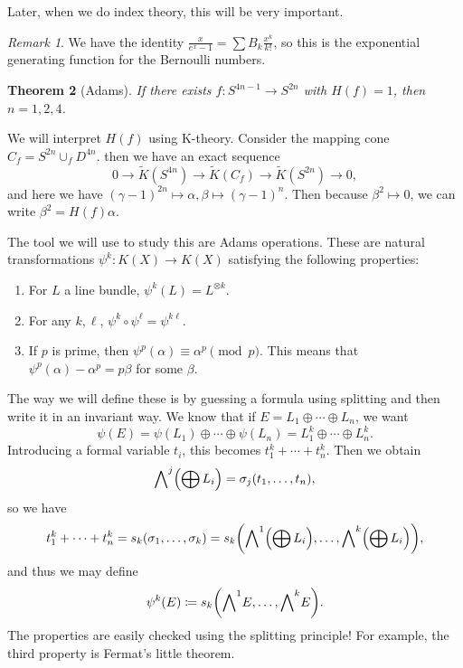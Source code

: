 \documentclass[leqno, openany]{memoir}
\newtheorem{thm}{Theorem}[section]
\theoremstyle{definition}
\theoremstyle{remark}
\newtheorem{rmk}[thm]{Remark}
\theoremstyle{plain}
\theoremstyle{definition}
\theoremstyle{remark}
\newcommand{\wt}[1]{\widetilde{#1}}
\begin{document}
Later, when we do index theory, this will be very important.

\begin{rmk}
    We have the identity $\frac{x}{e^x - 1} = \sum B_k \frac{x^k}{k!}$, so this is the exponential generating function for the Bernoulli numbers.
\end{rmk}

\begin{thm}[Adams]
    If there exists $f \colon S^{4n-1} \to S^{2n}$ with $H(f) = 1$, then $n = 1,2,4$.
\end{thm}

We will interpret $H(f)$ using K-theory. Consider the mapping cone $C_f = S^{2n} \cup_f D^{4n}$. then we have an exact sequence
\[ 0 \to \wt{K}(S^{4n}) \to \wt{K}(C_f) \to \wt{K}(S^{2n}) \to 0, \]
and here we have ${(\gamma-1)}^{2n} \mapsto \alpha, \beta \mapsto {(\gamma-1)}^n$. Then because $\beta^2 \mapsto 0$, we can write $\beta^2 = H(f) \alpha$.

The tool we will use to study this are Adams operations. These are natural transformations $\psi^k \colon K(X) \to K(X)$ satisfying the following properties:
\begin{enumerate}
    \item For $L$ a line bundle, $\psi^k(L) = L^{\otimes k}$.
    \item For any $k, \ell$, $\psi^k \circ \psi^{\ell} = \psi^{k\ell}$.
    \item If $p$ is prime, then $\psi^p(\alpha) \equiv \alpha^p \pmod p$. This means that $\psi^p(\alpha) - \alpha^p = p\beta$ for some $\beta$.
\end{enumerate}

The way we will define these is by guessing a formula using splitting and then write it in an invariant way. We know that if $E = L_1 \oplus \cdots \oplus L_n$, we want
\[ \psi(E) = \psi(L_1) \oplus \cdots \oplus \psi(L_n) = L_1^k \oplus \cdots \oplus L_n^k. \]
Introducing a formal variable $t_i$, this becomes $t_1^k + \cdots + t_n^k$. Then we obtain
\[ {\bigwedge}^j\qty(\bigoplus L_i) = \sigma_j(t_1, \ldots, t_n), \]
so we have 
\[ t_1^k + \cdots + t_n^k = s_k(\sigma_1, \ldots, \sigma_k) = s_k \qty({\bigwedge}^1\qty(\bigoplus L_i), \ldots, {\bigwedge}^k \qty(\bigoplus L_i)), \]
and thus we may define
\[ \psi^k(E) \coloneqq s_k \qty({\bigwedge}^1 E, \ldots, {\bigwedge}^k E). \]
The properties are easily checked using the splitting principle! For example, the third property is Fermat's little theorem. 
\end{document}
